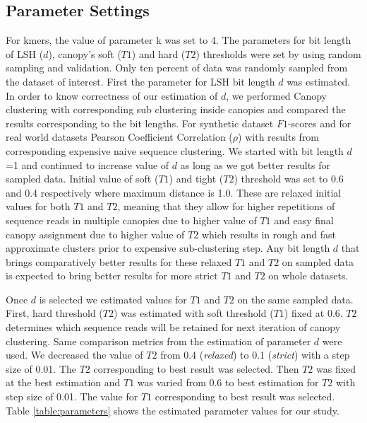 \documentclass[10pt, conference, compsocconf]{IEEEtran}
\begin{document}
\subsection{\textbf{Parameter Settings}}
For kmers, the value of parameter k was set to 4. The parameters for bit length of LSH ($d$), canopy's soft ($T1$) and hard ($T2$) thresholds were set by using random sampling and validation. Only ten percent of data was randomly sampled from the dataset of interest. First the parameter for LSH bit length $d$ was estimated. In order to know correctness of our estimation of $d$, we performed Canopy clustering with corresponding sub clustering inside canopies and compared the results corresponding to the bit lengths. For synthetic dataset $F1$-scores and for real world datasets Pearson Coefficient Correlation ($\rho$) with results from corresponding expensive naive sequence clustering. We started with bit length $d$=1 and continued to increase value of $d$ as long as we got better results for sampled data. Initial value of soft ($T1$) and tight ($T2$) threshold  was set to 0.6 and 0.4 respectively where maximum distance is 1.0. These are relaxed initial values for both $T1$ and $T2$, meaning that they allow for higher repetitions of sequence reads in multiple canopies due to higher value of $T1$ and easy final canopy assignment due to higher value of $T2$ which results in rough and fast approximate clusters prior to expensive sub-clustering step. Any bit length $d$ that brings comparatively better results for these relaxed $T1$ and $T2$ on sampled data is expected to bring better results for more strict $T1$ and $T2$ on whole datasets.

Once $d$ is selected we estimated values for $T1$ and $T2$ on the same sampled data. First, hard threshold ($T2$) was estimated with soft threshold ($T1$) fixed at 0.6. $T2$ determines which sequence reads will be retained for next iteration of canopy clustering. Same comparison metrics from the estimation of parameter $d$ were used. We decreased the value of $T2$ from 0.4 (\emph{relaxed}) to 0.1 (\emph{strict}) with a step size of 0.01. The $T2$ corresponding to best result was selected. Then $T2$ was fixed at the best estimation and $T1$ was varied from 0.6 to best estimation for $T2$ with step size of 0.01. The value for $T1$ corresponding to best result was selected. Table \ref{table:parameters} shows the estimated parameter values for our study.   
\end{document}
